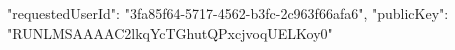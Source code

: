 \begin{spverbatim}
{
    "requestedUserId": "3fa85f64-5717-4562-b3fc-2c963f66afa6",
    "publicKey": "RUNLMSAAAAC2lkqYcTGhutQPxcjvoqUELKoy0"
}
\end{spverbatim}